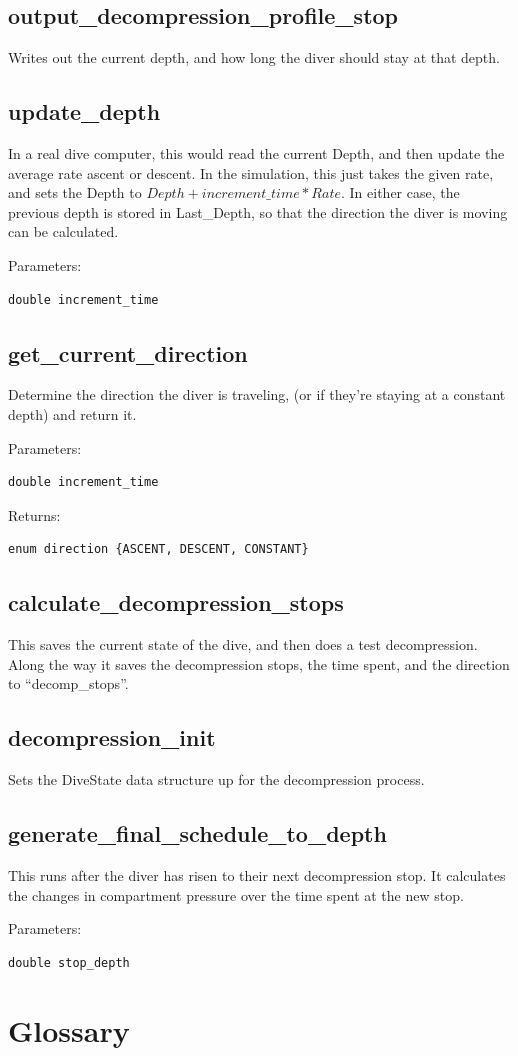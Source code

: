 \documentclass[12pt]{article}
\begin{document}
\subsection{output\_decompression\_profile\_stop}
Writes out the current depth, and how long the diver should stay at that depth.

\subsection{update\_depth}
In a real dive computer, this would read the current Depth, and then update the average
rate ascent or descent. In the simulation, this just takes the given rate, and sets
the Depth to $Depth + increment\_time * Rate$. In either case, the previous depth is
stored in Last\_Depth, so that the direction the diver is moving can be calculated.

Parameters:
\begin{verbatim}
double increment_time
\end{verbatim}

\subsection{get\_current\_direction}
Determine the direction the diver is traveling, (or if they're staying at a constant depth) and return it.

Parameters:
\begin{verbatim}
double increment_time
\end{verbatim}

Returns:
\begin{verbatim}
enum direction {ASCENT, DESCENT, CONSTANT}
\end{verbatim}

\subsection{calculate\_decompression\_stops}

This saves the current state of the dive, and then does a test decompression. Along
the way it saves the decompression stops, the time spent, and the direction to ``decomp\_stops''.

\subsection{decompression\_init}
Sets the DiveState data structure up for the decompression process.

\subsection{generate\_final\_schedule\_to\_depth}
This runs after the diver has risen to their next decompression stop. It calculates
the changes in compartment pressure over the time spent at the new stop.

Parameters:
\begin{verbatim}
double stop_depth
\end{verbatim}

\newpage
\section{Glossary}
\printglossary
{}
\end{document}
